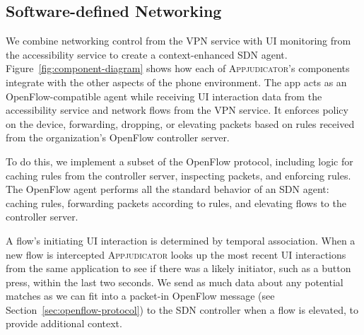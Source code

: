 \subsection{Software-defined Networking}
\label{sec:sdn-rule-cache}

We combine networking control from the VPN service with UI monitoring from the
accessibility service to create a context-enhanced SDN agent.
Figure~\ref{fig:component-diagram} shows how each of \textsc{Appjudicator}'s
components integrate with the other aspects of the phone environment. The app
acts as an OpenFlow-compatible agent while receiving UI interaction data from
the accessibility service and network flows from the VPN service. It enforces
policy on the device, forwarding, dropping, or elevating packets based on rules
received from the organization's OpenFlow controller server.

To do this, we implement a subset of the OpenFlow protocol, including logic for
caching rules from the controller server, inspecting packets, and enforcing
rules. The OpenFlow agent performs all the standard behavior of an SDN agent:
caching rules, forwarding packets according to rules, and elevating flows to the
controller server.

A flow's initiating UI interaction is determined by temporal association. When a
new flow is intercepted \textsc{Appjudicator} looks up the most recent UI
interactions from the same application to see if there was a likely initiator,
such as a button press, within the last two seconds. We send as much data about
any potential matches as we can fit into a packet-in OpenFlow message (see
Section~\ref{sec:openflow-protocol}) to the SDN controller when a flow is
elevated, to provide additional context.

\newpage

